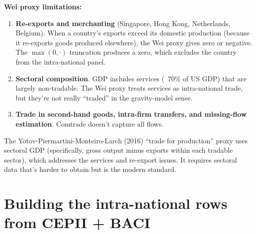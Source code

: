 \documentclass[11pt,letterpaper,oneside]{book}
\theoremstyle{definition}
\theoremstyle{remark}
\begin{document}
\begin{caveat}
\textbf{Wei proxy limitations:}
\begin{enumerate}
  \item \textbf{Re-exports and merchanting} (Singapore, Hong Kong,
    Netherlands, Belgium). When a country's exports exceed its
    domestic production (because it re-exports goods produced
    elsewhere), the Wei proxy gives zero or negative. The
    $\max(0, \cdot)$ truncation produces a zero, which excludes the
    country from the intra-national panel.
  \item \textbf{Sectoral composition}. GDP includes services
    (~70\% of US GDP) that are largely non-tradable. The Wei proxy
    treats services as intra-national trade, but they're not really
    ``traded'' in the gravity-model sense.
  \item \textbf{Trade in second-hand goods, intra-firm transfers,
    and missing-flow estimation}. Comtrade doesn't capture all flows.
\end{enumerate}

The Yotov-Piermartini-Monteiro-Larch (2016) ``trade for production''
proxy uses sectoral GDP (specifically, gross output minus exports
within each tradable sector), which addresses the services and
re-export issues. It requires sectoral data that's harder to obtain
but is the modern standard.
\end{caveat}

\section{Building the intra-national rows from CEPII + BACI}
\end{document}
